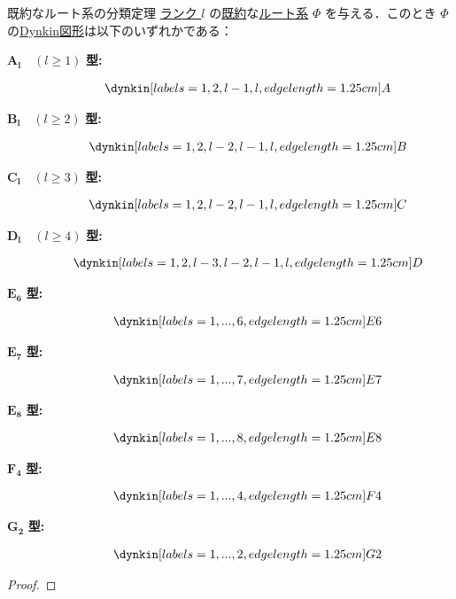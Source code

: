 \documentclass[rep_main]{subfiles}
\begin{document}
\begin{mytheo}[label=thm:root-classification,breakable]{既約なルート系の分類定理}
	\hyperref[def:rank-root]{ランク $l$} の\hyperref[def:irr-root]{既約}な\hyperref[ax:root-system]{ルート系} $\Phi$ を与える．このとき $\Phi$ の\hyperref[def:Coxeter-Dynkin]{Dynkin図形}は以下のいずれかである：
	\begin{description}
		\item[$\bm{A_l}\quad (l \ge 1)$ \textbf{型:}] 
		\begin{align}
			\dynkin[%
					labels={1,2,l-1,l},
					edge length=1.25cm
				] A{}
		\end{align}
		
		\item[$\bm{B_l}\quad (l \ge 2)$ \textbf{型:}] 
		\begin{align}
			\dynkin[%
					labels={1,2,l-2,l-1,l},
					edge length=1.25cm
				] B{}
		\end{align}

		\item[$\bm{C_l}\quad (l \ge 3)$ \textbf{型:}] 
		\begin{align}
			\dynkin[%
					labels={1,2,l-2,l-1,l},
					edge length=1.25cm
				] C{}
		\end{align}

		\item[$\bm{D_l}\quad (l \ge 4)$ \textbf{型:}] 
		\begin{align}
			\dynkin[%
					labels={1,2,l-3,l-2,l-1,l},
					edge length=1.25cm
				] D{}
		\end{align}

		\item[$\bm{E_6}$ \textbf{型:}] 
		\begin{align}
			\dynkin[%
					labels={1,...,6},
					edge length=1.25cm
				] E6
		\end{align}

		\item[$\bm{E_7}$ \textbf{型:}] 
		\begin{align}
			\dynkin[%
					labels={1,...,7},
					edge length=1.25cm
				] E7
		\end{align}

		\item[$\bm{E_8}$ \textbf{型:}] 
		\begin{align}
			\dynkin[%
					labels={1,...,8},
					edge length=1.25cm
				] E8
		\end{align}
		\item[$\bm{F_4}$ \textbf{型:}] 
		\begin{align}
			\dynkin[%
					labels={1,...,4},
					edge length=1.25cm
				] F4
		\end{align}
		\item[$\bm{G_2}$ \textbf{型:}] 
		\begin{align}
			\dynkin[%
					labels={1,...,2},
					edge length=1.25cm
				] G2
		\end{align}
	\end{description}
\end{mytheo}

\begin{proof}
	
\end{proof}
\end{document}
